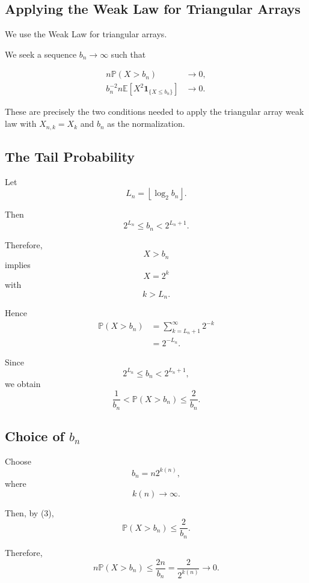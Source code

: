 
\subsection{Applying the Weak Law for Triangular Arrays}

We use the Weak Law for triangular arrays.

We seek a sequence $b_n\to\infty$ such that

\begin{align}
n\mathbb{P}(X>b_n)
&\longrightarrow0,
\tag{1}
\\
b_n^{-2}
n\mathbb{E}
\left[
X^2\mathbf{1}_{\{X\leq b_n\}}
\right]
&\longrightarrow0.
\tag{2}
\end{align}

These are precisely the two conditions needed to apply the triangular
array weak law with
\(
X_{n,k}=X_{k}
\)
and
\(
b_n
\)
as the normalization.

\subsection{The Tail Probability}

Let
\[
L_n
=
\left\lfloor
\log_2 b_n
\right\rfloor.
\]

Then
\[
2^{L_n}\leq b_n<2^{L_n+1}.
\]

Therefore,
\[
X>b_n
\]
implies
\[
X=2^k
\]
with
\[
k>L_n.
\]

Hence
\[
\begin{aligned}
\mathbb{P}(X>b_n)
&=
\sum_{k=L_n+1}^{\infty}2^{-k}\\
&=
2^{-L_n}.
\end{aligned}
\]

Since
\[
2^{L_n}\leq b_n<2^{L_n+1},
\]
we obtain
\[
\boxed{
\frac1{b_n}
<
\mathbb{P}(X>b_n)
\leq
\frac{2}{b_n}.
}
\tag{3}
\]

\subsection{Choice of \(b_n\)}

Choose
\[
\boxed{
b_n=n2^{k(n)},
}
\]
where
\[
k(n)\longrightarrow\infty.
\]

Then, by (3),
\[
\mathbb{P}(X>b_n)
\leq
\frac{2}{b_n}.
\]

Therefore,
\[
n\mathbb{P}(X>b_n)
\leq
\frac{2n}{b_n}
=
\frac{2}{2^{k(n)}}
\longrightarrow0.
\]

